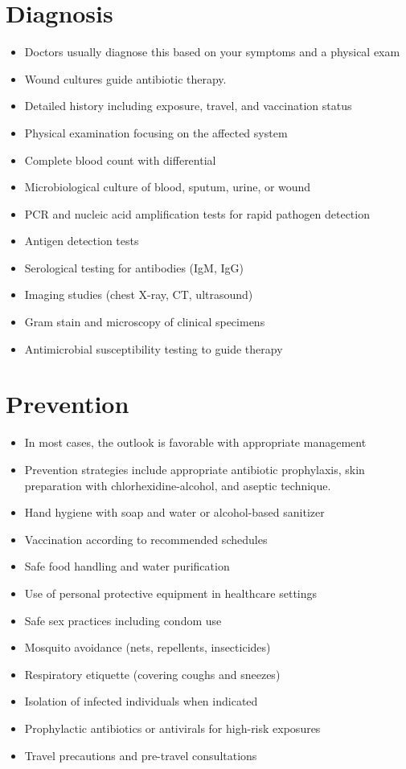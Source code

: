 \section{Diagnosis}
\begin{itemize}[noitemsep]
  \item Doctors usually diagnose this based on your symptoms and a physical exam
  \item Wound cultures guide antibiotic therapy.
  \item Detailed history including exposure, travel, and vaccination status
  \item Physical examination focusing on the affected system
  \item Complete blood count with differential
  \item Microbiological culture of blood, sputum, urine, or wound
  \item PCR and nucleic acid amplification tests for rapid pathogen detection
  \item Antigen detection tests
  \item Serological testing for antibodies (IgM, IgG)
  \item Imaging studies (chest X-ray, CT, ultrasound)
  \item Gram stain and microscopy of clinical specimens
  \item Antimicrobial susceptibility testing to guide therapy
\end{itemize}
\section{Prevention}
\begin{itemize}[noitemsep]
  \item In most cases, the outlook is favorable with appropriate management
  \item Prevention strategies include appropriate antibiotic prophylaxis, skin preparation with chlorhexidine-alcohol, and aseptic technique.
  \item Hand hygiene with soap and water or alcohol-based sanitizer
  \item Vaccination according to recommended schedules
  \item Safe food handling and water purification
  \item Use of personal protective equipment in healthcare settings
  \item Safe sex practices including condom use
  \item Mosquito avoidance (nets, repellents, insecticides)
  \item Respiratory etiquette (covering coughs and sneezes)
  \item Isolation of infected individuals when indicated
  \item Prophylactic antibiotics or antivirals for high-risk exposures
  \item Travel precautions and pre-travel consultations
\end{itemize}
